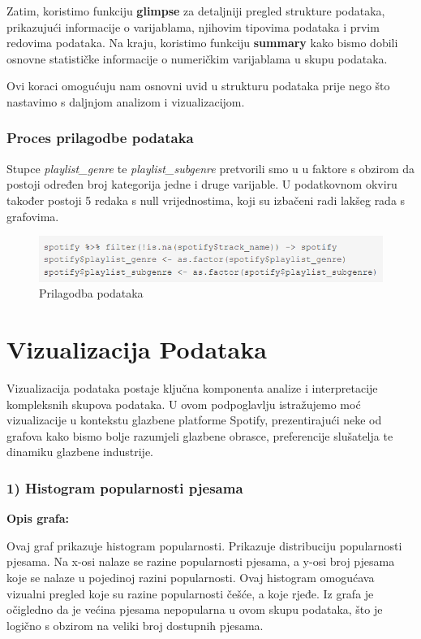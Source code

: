 		Zatim, koristimo funkciju \textbf{glimpse} za detaljniji pregled strukture podataka, prikazujući informacije o varijablama, njihovim tipovima podataka i prvim redovima podataka. Na kraju, koristimo funkciju \textbf{summary} kako bismo dobili osnovne statističke informacije o numeričkim varijablama u skupu podataka.
		
		Ovi koraci omogućuju nam osnovni uvid u strukturu podataka prije nego što nastavimo s daljnjom analizom i vizualizacijom.
		
	
	\subsubsection{Proces prilagodbe podataka}
	Stupce \textit{playlist\_genre} te \textit{playlist\_subgenre} pretvorili smo u u faktore s obzirom da postoji određen broj kategorija jedne i druge varijable. U podatkovnom okviru također postoji 5 redaka s null vrijednostima, koji su izbačeni radi lakšeg rada s grafovima.
	
	\begin{figure}[H]
		\includegraphics[scale=0.9]{slike/prilagodba.png}
		\centering
		\caption{Prilagodba podataka}
		
	\end{figure}
	


\clearpage
\section{Vizualizacija Podataka}
	Vizualizacija podataka postaje ključna komponenta analize i interpretacije kompleksnih skupova podataka. 
	U ovom podpoglavlju istražujemo moć vizualizacije u kontekstu glazbene platforme Spotify, prezentirajući neke od grafova kako bismo bolje razumjeli glazbene obrasce, preferencije slušatelja te dinamiku glazbene industrije.
	
	\subsubsection{1) Histogram popularnosti pjesama}
	
	\textbf{Opis grafa:}
	
	Ovaj graf prikazuje histogram popularnosti. Prikazuje distribuciju popularnosti pjesama. Na x-osi nalaze se razine popularnosti pjesama, a y-osi broj pjesama koje se nalaze u pojedinoj razini popularnosti.
	Ovaj histogram omogućava vizualni pregled koje su razine popularnosti češće, a koje rjeđe. 
	Iz grafa je očigledno da je većina pjesama nepopularna u ovom skupu podataka, što je logično s obzirom na veliki broj dostupnih pjesama.

